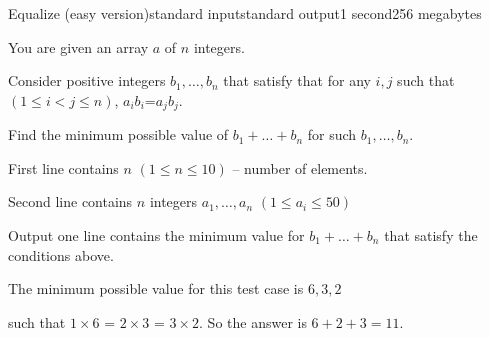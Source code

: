 \begin{problem}{Equalize (easy version)}{standard input}{standard output}{1 second}{256 megabytes}

You are given an array $a$ of $n$ integers.

Consider positive integers $b_1$$,\dots,$$b_n$ that satisfy that for any $i,j$ such that $(1\le i < j \le n)$, $a_i$$b_i$=$a_jb_j$.

Find the minimum possible value of 
$b_1 +\dots+ b_n$ for such $b_1,\dots,b_n$.

\InputFile
First line contains $n$ $(1\le n\le 10 )$ -- number of elements.

Second line contains $n$ integers $a_1,\dots,a_n$ $(1\le a_i \le 50)$

\OutputFile
Output one line contains the minimum value for $b_1 +\dots+ b_n$ that satisfy the conditions above.

\Example

\begin{example}
%
\end{example}

\Note
The minimum possible value for this test case is $6,3,2$

such that $1\times 6$ = $2 \times 3$ = $3\times 2$. So the answer is $6+2+3=11$.

\end{problem}

